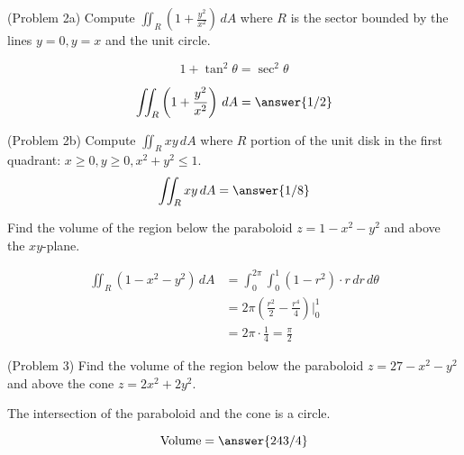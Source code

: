 \documentclass[handout]{ximera}
\begin{document}
\begin{problem}(Problem 2a)
Compute $\iint_R \left(1 + \frac{y^2}{x^2}\right) \, dA$ where $R$ is the sector bounded by the lines $y = 0, y = x$ and the unit circle.\\
\begin{hint}
\[
1 + \tan^2 \theta = \sec^2 \theta
\]
\end{hint}
\[
\iint_R \left(1 + \frac{y^2}{x^2}\right) \, dA = \answer{1/2}
\]
\end{problem}

\begin{problem}(Problem 2b)
Compute $\iint_R xy \, dA$ where $R$  portion of the unit disk in the first quadrant: $x \geq 0, y\geq 0, x^2 + y^2 \leq 1$.\\
\[
\iint_R xy \, dA = \answer{1/8}
\]
\end{problem}


\begin{example}[Example 3]
Find the volume of the region below the paraboloid $z = 1 - x^2 - y^2$ and above the $xy$-plane.\\

\begin{image}
\end{image}

\begin{align*}
\iint_R (1-x^2 - y^2) \, dA &= \int_0^{2\pi} \int_0^1 (1-r^2) \cdot r \, dr \, d\theta\\
                            &= 2\pi \left(\frac{r^2}{2} - \frac{r^4}{4}\right) \bigg|_0^1\\
                            &= 2\pi \cdot \frac14 = \frac{\pi}{2}
\end{align*}
\end{example}

\begin{problem}(Problem 3)
Find the volume of the region below the paraboloid $z = 27 - x^2 - y^2$ and above the cone $z = 2x^2 + 2y^2$.\\
\begin{hint}
The intersection of the paraboloid and the cone is a circle.
\end{hint}
\[
\text{Volume} = \answer{243/4}
\]
\end{problem}
\end{document}
